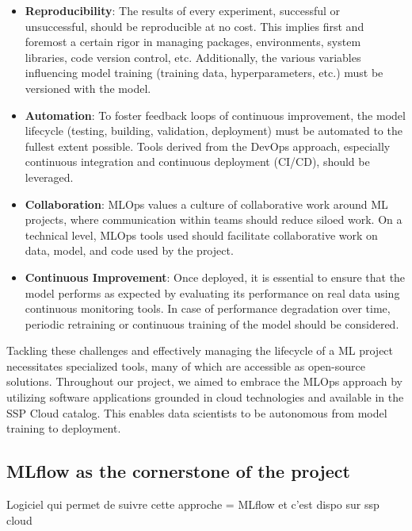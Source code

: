 \begin{itemize}
    \item \textbf{Reproducibility}: The results of every experiment, successful or unsuccessful, should be reproducible at no cost. This implies first and foremost a certain rigor in managing packages, environments, system libraries, code version control, etc. Additionally, the various variables influencing model training (training data, hyperparameters, etc.) must be versioned with the model.
    
    \item \textbf{Automation}: To foster feedback loops of continuous improvement, the model lifecycle (testing, building, validation, deployment) must be automated to the fullest extent possible. Tools derived from the DevOps approach, especially continuous integration and continuous deployment (CI/CD), should be leveraged.
    
    \item \textbf{Collaboration}: MLOps values a culture of collaborative work around ML projects, where communication within teams should reduce siloed work. On a technical level, MLOps tools used should facilitate collaborative work on data, model, and code used by the project.
    
    \item \textbf{Continuous Improvement}: Once deployed, it is essential to ensure that the model performs as expected by evaluating its performance on real data using continuous monitoring tools. In case of performance degradation over time, periodic retraining or continuous training of the model should be considered.
\end{itemize}


Tackling these challenges and effectively managing the lifecycle of a ML project necessitates specialized tools, many of which are accessible as open-source solutions. Throughout our project, we aimed to embrace the MLOps approach by utilizing software applications grounded in cloud technologies and available in the SSP Cloud catalog. This enables data scientists to be autonomous from model training to deployment.

\subsection{MLflow as the cornerstone of the project}

Logiciel qui permet de suivre cette approche = MLflow et c'est dispo sur ssp cloud

